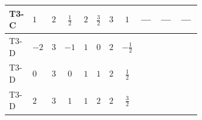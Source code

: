 \documentclass[8pt]{article}
\begin{document}
\begin{landscape}
\begin{longtable}{@{}llcccccc >{\raggedright\arraybackslash}p{0.21\linewidth} >{\raggedright\arraybackslash}p{0.21\linewidth} >{\raggedright\arraybackslash}p{0.21\linewidth}@{}}
\midrule
T3-C & $1$ & $2$ & $\frac{1}{2}$ & $2$ & $\frac{3}{2}$ & $3$ & $1$ & --- & --- & --- \\
\midrule
T3-D & $-2$ & $3$ & $-1$ & $1$ & $0$ & $2$ & $-\frac{1}{2}$ & \scriptsize\adjustbox{max width=\linewidth}{$\begin{gathered} {\lambda_{S_1}^{(1)}} \left(\frac{1}{2} T_{\nu}^{(1)}+13 {\lambda_{S_1}^{(A)}}\right)\end{gathered}$} & \scriptsize\adjustbox{max width=\linewidth}{$\begin{gathered} +4 {\lambda_{S_1}^{(A)}} T_{\nu}^{(1)}\end{gathered}$} & \scriptsize\adjustbox{max width=\linewidth}{$\begin{gathered} -\operatorname{Tr}\!\left({y_1}\,\left({y_1}\right)^{\dagger}\,{y_1}\,\left({y_1}\right)^{\dagger}\right)\end{gathered}$} \\
\midrule
T3-D & $0$ & $3$ & $0$ & $1$ & $1$ & $2$ & $\frac{1}{2}$ & \scriptsize\adjustbox{max width=\linewidth}{$\begin{gathered} {\lambda_{S_1}^{(1)}} \left(\frac{1}{2} T_{\nu}^{(1)}+13 {\lambda_{S_1}^{(A)}}\right)\end{gathered}$} & \scriptsize\adjustbox{max width=\linewidth}{$\begin{gathered} +4 {\lambda_{S_1}^{(A)}} T_{\nu}^{(1)}\end{gathered}$} & \scriptsize\adjustbox{max width=\linewidth}{$\begin{gathered} -\operatorname{Tr}\!\left({y_1}\,\left({y_1}\right)^{\dagger}\,{y_1}\,\left({y_1}\right)^{\dagger}\right)\end{gathered}$} \\
\midrule
T3-D & $2$ & $3$ & $1$ & $1$ & $2$ & $2$ & $\frac{3}{2}$ & \scriptsize\adjustbox{max width=\linewidth}{$\begin{gathered} {\lambda_{S_1}^{(1)}} \left(\frac{1}{2} T_{\nu}^{(1)}+13 {\lambda_{S_1}^{(A)}}\right)\end{gathered}$} & \scriptsize\adjustbox{max width=\linewidth}{$\begin{gathered} +4 {\lambda_{S_1}^{(A)}} T_{\nu}^{(1)}\end{gathered}$} & \scriptsize\adjustbox{max width=\linewidth}{$\begin{gathered} -\operatorname{Tr}\!\left({y_1}\,\left({y_1}\right)^{\dagger}\,{y_1}\,\left({y_1}\right)^{\dagger}\right)\end{gathered}$} \\

\end{longtable}
\end{landscape}
\end{document}

